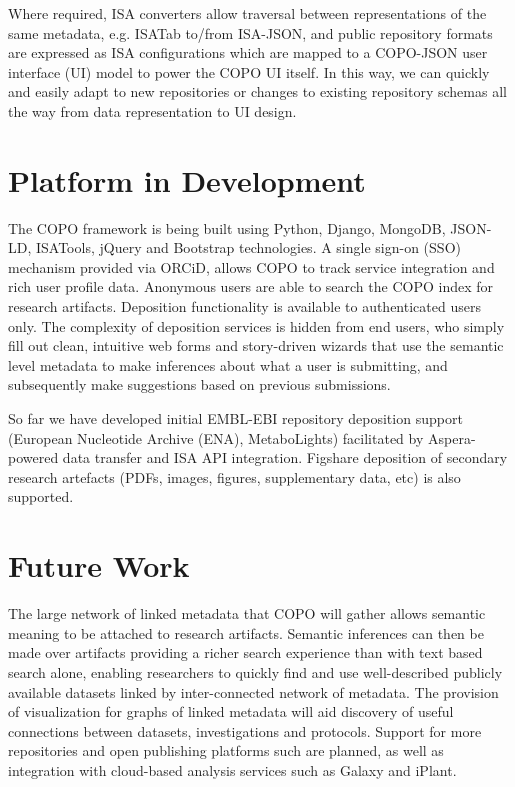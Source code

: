 \documentclass[runningheads,a4paper]{llncs}
\begin{document}
Where required, ISA converters allow traversal between representations
of the same metadata, e.g. ISATab to/from ISA-JSON, and public
repository formats are expressed as ISA configurations which are
mapped to a COPO-JSON user interface (UI) model to power the COPO UI
itself. In this way, we can quickly and easily adapt to new
repositories or changes to existing repository schemas all the way
from data representation to UI design.

\vspace*{-0.1in}
\section{Platform in Development}
The COPO framework is being built using Python, Django, MongoDB,
JSON-LD, ISATools, jQuery and Bootstrap technologies. A single sign-on (SSO) mechanism provided via ORCiD, allows COPO to track
service integration and rich user profile data. Anonymous users are
able to search the COPO index for research artifacts. Deposition functionality is available to authenticated users only. The
complexity of deposition services is hidden from end users, who simply
fill out clean, intuitive web forms and story-driven wizards that use
the semantic level metadata to make inferences about what a user is
submitting, and subsequently make suggestions based on previous
submissions.

So far we have developed initial EMBL-EBI repository deposition
support (European Nucleotide Archive (ENA), MetaboLights) facilitated
by Aspera-powered data transfer and ISA API integration. Figshare
deposition of secondary research artefacts (PDFs, images, figures,
supplementary data, etc) is also supported.

\vspace*{-0.1in}
\section{Future Work}
The large network of linked metadata that COPO will gather allows
semantic meaning to be attached to research artifacts. Semantic
inferences can then be made over artifacts providing a richer search
experience than with text based search alone, enabling researchers
to quickly find and use well-described publicly available datasets
linked by inter-connected network of metadata. The provision of
visualization for graphs of linked metadata will aid discovery of
useful connections between datasets, investigations and
protocols. Support for more repositories and open publishing platforms
such are planned, as
well as integration with cloud-based analysis services such as Galaxy
and iPlant.
\end{document}
